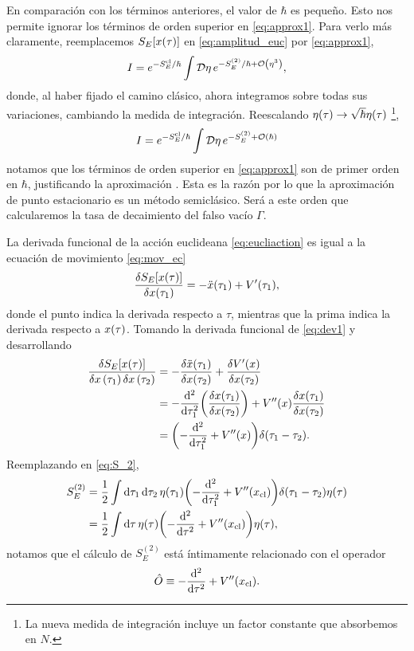 En comparación con los términos anteriores, el valor de $\hbar$ es pequeño. Esto nos permite ignorar los términos de orden superior en \eqref{eq:approx1}. Para verlo más claramente, reemplacemos $S_{E}\qty[x\qty(\tau)]$ en \eqref{eq:amplitud_euc} por \eqref{eq:approx1},
\begin{equation}\label{eq:Iaprox1}
I = e^{-S_E^{\textrm{cl}}/\hbar} \int \mathcal{D}\eta \, e^{-S_E^{(2)}/\hbar + \order{\eta^3}},
\end{equation}
donde, al haber fijado el camino clásico, ahora integramos sobre todas sus variaciones, cambiando la medida de integración. Reescalando $\eta\qty(\tau) \rightarrow \sqrt{\hbar}\eta\qty(\tau)$ \footnote{La nueva medida de integración incluye un factor constante que absorbemos en $N$.},
\begin{equation}\label{eq:Iaprox2}
I = e^{-S_E^{\textrm{cl}}/\hbar} \int \mathcal{D}\eta \, e^{-S_E^{(2)} + \order{\hbar}}
\end{equation}
notamos que los términos de orden superior en \eqref{eq:approx1} son de primer orden en $\hbar$, justificando la aproximación \cite{paranjape2017theory}. Esta es la razón por lo que la aproximación de punto estacionario es un método semiclásico. Será a este orden que calcularemos la tasa de decaimiento del falso vacío $\Gamma$. 

La derivada funcional de la acción euclideana \eqref{eq:eucliaction} es igual a la ecuación de movimiento \eqref{eq:mov_ec}
\begin{equation} \label{eq:dev1}
	\fdv{S_E\qty[x\qty(\tau)]}{x\qty(\tau_1)} = -\ddot{x}\qty(\tau_1) + V'\qty(\tau_1),
\end{equation}
donde el punto indica la derivada respecto a $\tau$, mientras que la prima indica la derivada respecto a $x\qty(\tau)$. Tomando la derivada funcional de \eqref{eq:dev1} y desarrollando 
\begin{align}
\frac{\var{S_E[x\qty(\tau)]}}{{\var{x}(\tau_1)} \var{x}\qty(\tau_2)} &= -\fdv{\ddot{x}\qty(\tau_1)}{x\qty(\tau_2)} + \fdv{V'\qty(x)}{x\qty(\tau_2)} \\
&= -\dv[2]{\tau_1}\qty(\fdv{x\qty(\tau_1)}{x\qty(\tau_2)}) + V''\qty(x)\fdv{x\qty(\tau_1)}{x\qty(\tau_2)} \\
&= \qty(-\dv[2]{\tau_1} + V''\qty(x)) \delta\qty(\tau_1 - \tau_2).
\end{align}
Reemplazando en \eqref{eq:S_2},
\begin{align}
	S_E^{(2)} &= \frac{1}{2} \int \dd{\tau_1} \dd{\tau_2} \eta\qty(\tau_1) \qty(-\dv[2]{\tau_1} + V''\qty(x_{\text{cl}}))\delta\qty(\tau_1 - \tau_2) \eta\qty(\tau) \\ \label{eq:S_2_1}
	&= \frac{1}{2} \int \dd{\tau} \eta\qty(\tau) \qty(-\dv[2]{\tau} + V''\qty(x_{\text{cl}})) \eta\qty(\tau),
\end{align}
notamos que el cálculo de $S_E^{(2)}$ está íntimamente relacionado con el operador
\begin{equation} \label{eq:operador}
	\hat{O} \equiv -\dv[2]{\tau} + V''\qty(x_{\text{cl}}).
\end{equation}

